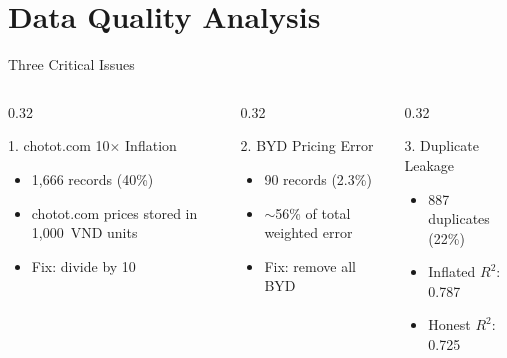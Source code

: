 \documentclass[aspectratio=169]{beamer}
\begin{document}


    \section{Data Quality Analysis}

    \begin{frame}{Three Critical Issues}
        \begin{columns}[T]
            \begin{column}{0.32\textwidth}
                \begin{block}{\small 1. chotot.com 10$\times$ Inflation}
                    \small
                    \begin{itemize}
                        \item 1,666 records (40\%)
                        \item chotot.com prices stored in 1,000~VND units
                        \item Fix: divide by 10
                    \end{itemize}
                \end{block}
            \end{column}
            \begin{column}{0.32\textwidth}
                \begin{block}{\small 2. BYD Pricing Error}
                    \small
                    \begin{itemize}
                        \item 90 records (2.3\%)
                        \item $\sim$56\% of total weighted error
                        \item Fix: remove all BYD
                    \end{itemize}
                \end{block}
            \end{column}
            \begin{column}{0.32\textwidth}
                \begin{block}{\small 3. Duplicate Leakage}
                    \small
                    \begin{itemize}
                        \item 887 duplicates (22\%)
                        \item Inflated $R^2$: 0.787
                        \item Honest $R^2$: 0.725
                    \end{itemize}
                \end{block}
            \end{column}
        \end{columns}


\end{frame}
\end{document}
